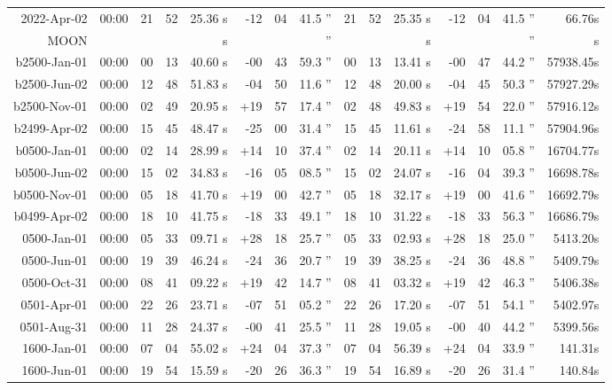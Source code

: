 \begin{longtable}{r@{\,}r|r@{h\,}r@{m\,}r<{s}|r@{°\,}r@{'\,}r<{''}||r@{h\,}r@{m\,}r<{s}|r@{°\,}r@{'\,}r<{''}r<{s}}
 2022-Apr-02 & 00:00  &   21 & 52 & 25.36 & -12 & 04 & 41.5 & 21&52&25.35 & -12&04&41.5 & 66.76\\ %
MOON   \\
b2500-Jan-01 & 00:00  &   00 & 13 & 40.60 & -00 & 43 & 59.3 & 00&13&13.41 & -00&47&44.2 & 57938.45\\ %
b2500-Jun-02 & 00:00  &   12 & 48 & 51.83 & -04 & 50 & 11.6 & 12&48&20.00 & -04&45&50.3 & 57927.29\\ %
b2500-Nov-01 & 00:00  &   02 & 49 & 20.95 & +19 & 57 & 17.4 & 02&48&49.83 & +19&54&22.0 & 57916.12\\ %
b2499-Apr-02 & 00:00  &   15 & 45 & 48.47 & -25 & 00 & 31.4 & 15&45&11.61 & -24&58&11.1 & 57904.96\\ %
b0500-Jan-01 & 00:00  &   02 & 14 & 28.99 & +14 & 10 & 37.4 & 02&14&20.11 & +14&10&05.8 & 16704.77\\ %
b0500-Jun-02 & 00:00  &   15 & 02 & 34.83 & -16 & 05 & 08.5 & 15&02&24.07 & -16&04&39.3 & 16698.78\\ %
b0500-Nov-01 & 00:00  &   05 & 18 & 41.70 & +19 & 00 & 42.7 & 05&18&32.17 & +19&00&41.6 & 16692.79\\ %
b0499-Apr-02 & 00:00  &   18 & 10 & 41.75 & -18 & 33 & 49.1 & 18&10&31.22 & -18&33&56.3 & 16686.79\\ %
 0500-Jan-01 & 00:00  &   05 & 33 & 09.71 & +28 & 18 & 25.7 & 05&33&02.93 & +28&18&25.0 & 5413.20\\ %
 0500-Jun-01 & 00:00  &   19 & 39 & 46.24 & -24 & 36 & 20.7 & 19&39&38.25 & -24&36&48.8 & 5409.79\\ %
 0500-Oct-31 & 00:00  &   08 & 41 & 09.22 & +19 & 42 & 14.7 & 08&41&03.32 & +19&42&46.3 & 5406.38\\ %
 0501-Apr-01 & 00:00  &   22 & 26 & 23.71 & -07 & 51 & 05.2 & 22&26&17.20 & -07&51&54.1 & 5402.97\\ %
 0501-Aug-31 & 00:00  &   11 & 28 & 24.37 & -00 & 41 & 25.5 & 11&28&19.05 & -00&40&44.2 & 5399.56\\ %
 1600-Jan-01 & 00:00  &   07 & 04 & 55.02 & +24 & 04 & 37.3 & 07&04&56.39 & +24&04&33.9 & 141.31\\ %
 1600-Jun-01 & 00:00  &   19 & 54 & 15.59 & -20 & 26 & 36.3 & 19&54&16.89 & -20&26&31.4 & 140.84\\ %

\end{longtable}
